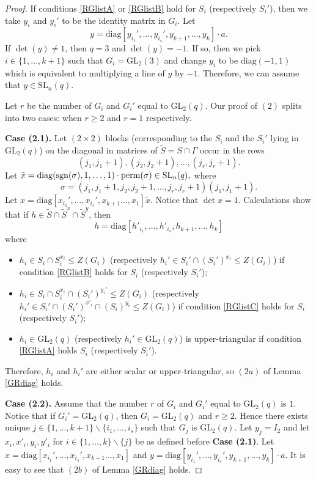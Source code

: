 \documentclass[a4paper,reqno,11pt]{amsart}
\theoremstyle{definition}
\theoremstyle{remark}
\numberwithin{equation}{section}
\newcommand{\diag}{\mathrm{diag}}
\newcommand{\sgn}{\mathrm{sgn}}
\newcommand{\SL}{{\mathrm{SL}}}
\newcommand{\GL}{{\mathrm{GL}}}
\begin{document}
\begin{proof}
If conditions \ref{RGlistA} or \ref{RGlistB} hold for $S_i$ (respectively $S_i'$), then we take $y_i$ and $y_i'$ to be the identity matrix in $G_i.$ Let 
$$y=\diag[y_{i_1}', \ldots, y_{i_s}', y_{k+1}, \ldots, y_k] \cdot a.$$
If $\det (y) \ne 1$, then $q=3$ and $\det(y)=-1.$ If so, then we pick  $i \in \{1, \ldots, k+1\}$  such that $G_i=\GL_2(3)$ and change $y_i$ to be $\diag(-1,1)$ which is equivalent to multiplying a line of $y$ by $-1.$  Therefore, we can assume that $y \in \SL_n(q).$   

Let $r$ be the number of $G_i$ and $G_i'$ equal to $\GL_2(q)$. Our proof of $(2)$ splits into two cases: 
when $r \ge 2$
and $r=1$ respectively.


\medskip

{\bf Case (2.1).}  
  Let    $(2 \times 2)$ blocks (corresponding to the $S_i$ and the $S_i'$ lying in $\GL_2(q)$) on the diagonal in matrices of $\tilde{S}=S \cap \Gamma$ occur in the rows $$(j_1, j_1+1), (j_2, j_2 +1), \ldots, (j_r, j_r+1).$$ 
Let $\tilde{x}=\diag(\sgn(\sigma), 1, \ldots, 1) \cdot {\rm perm}(\sigma) \in \SL_n(q),$ where  $$\sigma=(j_1, j_1+1, j_2, j_2 +1, \ldots, j_r, j_r+1)(j_1, j_1+1).$$  
Let $x= \diag[x_{i_1}',\ldots, x_{i_s}', x_{k+1}  \ldots, x_1]\tilde{x}$. Notice that $\det x=1.$ Calculations show that if $h \in \tilde{S} \cap \tilde{S}^x \cap \tilde{S}^y$, then 
$$h=\diag[h'_{i_1}, \ldots, h'_{i_s}, h_{k+1}, \ldots, h_k]$$
where
\begin{itemize}
\item $h_i \in S_i \cap S_i^{x_i} \le Z(G_i)$ (respectively $h_i' \in S_i' \cap (S_i')^{x_i} \le Z(G_i)$) if condition \ref{RGlistB} holds for $S_i$ (respectively $S_i'$);
\item $h_i \in S_i \cap S_i^{x_i} \cap (S_i')^{y_i'} \le Z(G_i)$ (respectively $h_i' \in S_i' \cap (S_i')^{x'_i} \cap (S_i)^{y_i} \le Z(G_i)$) if condition \ref{RGlistC} holds for $S_i$ (respectively $S_i'$);
\item $h_i \in \GL_2(q)$ (respectively $h_i' \in \GL_2(q)$) is upper-triangular if condition \ref{RGlistA} holds
$S_i$ (respectively $S_i'$).
\end{itemize}
 Therefore, $h_i$ and $h_i'$ are either scalar or upper-triangular, so  $(2a)$   of Lemma \ref{GRdiag} holds.

\medskip

{\bf Case (2.2).} Assume that the number $r$ of $G_i$ and $G_i'$ equal to $\GL_2(q)$ is $1$. Notice that if $G_i'=\GL_2(q)$, then $G_i=\GL_2(q)$ and $r \ge 2.$ Hence there exists unique $j \in \{1, \ldots, k+1\} \backslash \{i_1, \ldots, i_s\}$ such that $G_j$ is $\GL_2(q)$.  Let $y_j=I_2$  and let $x_i, x'_i, y_i, y'_i$ for $i \in \{1, \ldots, k\} \backslash \{j\}$  be as defined before {\bf Case (2.1)}. Let $x=\diag[x_{i_1}',\ldots, x_{i_s}', x_{k+1}  \ldots, x_1]$ and $y=\diag[y_{i_1}', \ldots, y_{i_s}', y_{k+1}, \ldots, y_k] \cdot a$. It is easy to see that $(2b)$   of Lemma \ref{GRdiag} holds.  
\end{proof}
\end{document}
